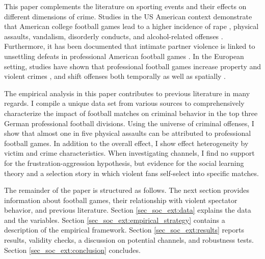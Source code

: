 This paper complements the literature on sporting events and their effects on different dimensions of crime. Studies in the US American context demonstrate that American college football games lead to a higher incidence of rape \citep{lindo2018college}, physical assaults, vandalism, disorderly conducts, and alcohol-related offenses \citep{rees2009college}. Furthermore, it has been documented that intimate partner violence is linked to unsettling defeats in professional American football games \citep{card2011family}. In the European setting, studies have shown that professional football games increase property and violent crimes \citep{marie2016police}, and shift offenses both temporally \citep{montolio2016time} as well as spatially \citep{montolio2019measuring}.




The empirical analysis in this paper contributes to previous literature in many regards. I compile a unique data set from various sources to comprehensively characterize the impact of football matches on criminal behavior in the top three German professional football divisions. Using the universe of criminal offenses, I show that almost one in five physical assaults can be attributed to professional football games. In addition to the overall effect, I show effect heterogeneity by victim and crime characteristics. When investigating channels, I find no support for the frustration-aggression hypothesis, but evidence for the social learning theory and a selection story in which violent fans self-select into specific matches.





The remainder of the paper is structured as follows. The next section provides information about football games, their relationship with violent spectator behavior, and previous literature. Section \ref{sec_soc_ext:data} explains the data and the variables. Section \ref{sec_soc_ext:empirical_strategy} contains a description of the empirical framework. Section \ref{sec_soc_ext:results} reports results, validity checks, a discussion on potential channels, and robustness tests. Section \ref{sec_soc_ext:conclusion} concludes.






\bigskip
